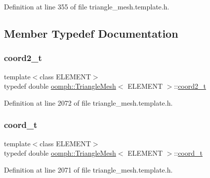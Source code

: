 Definition at line 355 of file triangle\+\_\+mesh.\+template.\+h.



\subsection{Member Typedef Documentation}
\mbox{\label{classoomph_1_1TriangleMesh_afd4948d805e89116cc5da629e413a449}} 
\subsubsection{\texorpdfstring{coord2\+\_\+t}{coord2\_t}}
{\footnotesize\ttfamily template$<$class E\+L\+E\+M\+E\+NT$>$ \\
typedef double \hyperlink{classoomph_1_1TriangleMesh}{oomph\+::\+Triangle\+Mesh}$<$ E\+L\+E\+M\+E\+NT $>$\+::\hyperlink{classoomph_1_1TriangleMesh_afd4948d805e89116cc5da629e413a449}{coord2\+\_\+t}\hspace{0.3cm}{\ttfamily [private]}}



Definition at line 2072 of file triangle\+\_\+mesh.\+template.\+h.

\mbox{\label{classoomph_1_1TriangleMesh_ad50b14a66b40a3bfb22a43df86c9006e}} 
\subsubsection{\texorpdfstring{coord\+\_\+t}{coord\_t}}
{\footnotesize\ttfamily template$<$class E\+L\+E\+M\+E\+NT$>$ \\
typedef double \hyperlink{classoomph_1_1TriangleMesh}{oomph\+::\+Triangle\+Mesh}$<$ E\+L\+E\+M\+E\+NT $>$\+::\hyperlink{classoomph_1_1TriangleMesh_ad50b14a66b40a3bfb22a43df86c9006e}{coord\+\_\+t}\hspace{0.3cm}{\ttfamily [private]}}



Definition at line 2071 of file triangle\+\_\+mesh.\+template.\+h.



